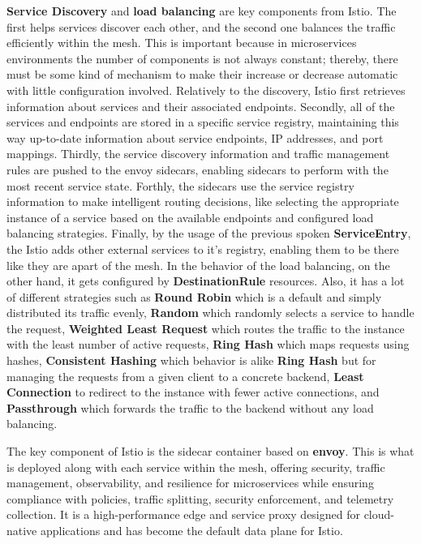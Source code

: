 \textbf{Service Discovery} and \textbf{load balancing} are key components from Istio. The first helps services discover each other, and the second one balances the traffic efficiently within the mesh. This is important because in microservices environments the number of components is not always constant; thereby, there must be some kind of mechanism to make their increase or decrease automatic with little configuration involved. Relatively to the discovery, Istio first retrieves information about services and their associated endpoints. Secondly, all of the services and endpoints are stored in a specific service registry, maintaining this way up-to-date information about service endpoints, IP addresses, and port mappings. Thirdly, the service discovery information and traffic management rules are pushed to the envoy sidecars, enabling sidecars to perform with the most recent service state. Forthly, the sidecars use the service registry information to make intelligent routing decisions, like selecting the appropriate instance of a service based on the available endpoints and configured load balancing strategies. Finally, by the usage of the previous spoken \textbf{ServiceEntry}, the Istio adds other external services to it's registry, enabling them to be there like they are apart of the mesh. In the behavior of the load balancing, on the other hand, it gets configured by \textbf{DestinationRule} resources. Also, it has a lot of different strategies such as \textbf{Round Robin} which is a default and simply distributed its traffic evenly, \textbf{Random} which randomly selects a service to handle the request, \textbf{Weighted Least Request} which routes the traffic to the instance with the least number of active requests, \textbf{Ring Hash} which maps requests using hashes, \textbf{Consistent Hashing} which behavior is alike \textbf{Ring Hash} but for managing the requests from a given client to a concrete backend, \textbf{Least Connection} to redirect to the instance with fewer active connections, and \textbf{Passthrough} which forwards the traffic to the backend without any load balancing.

The key component of Istio is the sidecar container based on \textbf{envoy}. This is what is deployed along with each service within the mesh, offering security, traffic management, observability, and resilience for microservices while ensuring compliance with policies, traffic splitting, security enforcement, and telemetry collection. It is a high-performance edge and service proxy designed for cloud-native applications and has become the default data plane for Istio.

